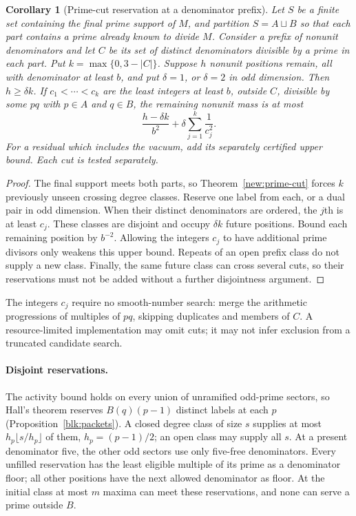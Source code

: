 \documentclass[11pt]{amsart}
\numberwithin{equation}{section}
\newtheorem{corollary}[theorem]{Corollary}
\theoremstyle{definition}
\theoremstyle{plain}
\begin{document}
\begin{corollary}[Prime-cut reservation at a denominator prefix]
\label{new:prime-cut-prefix}
Let $S$ be a finite set containing the final prime support of $M$,
and partition $S=A\sqcup B$ so that each part contains a prime
already known to divide $M$. Consider a prefix of nonunit
denominators and let $C$ be its set of distinct denominators
divisible by a prime in each part. Put $k=\max\{0,3-|C|\}$.
Suppose $h$ nonunit positions remain, all with denominator at least
$b$, and put $\delta=1$, or $\delta=2$ in odd dimension.
Then $h\ge\delta k$. If $c_1<\cdots<c_k$ are the least integers
at least $b$, outside $C$, divisible by some $pq$ with $p\in A$
and $q\in B$, the remaining nonunit mass is at most
\begin{equation}\label{eq:prime-cut-prefix-mass}
 \frac{h-\delta k}{b^2}+\delta\sum_{j=1}^k\frac1{c_j^2}.
\end{equation}
For a residual which includes the vacuum, add its separately
certified upper bound. Each cut is tested separately.
\end{corollary}
\begin{proof}
The final support meets both parts, so Theorem~\ref{new:prime-cut}
forces $k$ previously unseen crossing degree classes. Reserve one
label from each, or a dual pair in odd dimension. When their distinct
denominators are ordered, the $j$th is at least $c_j$. These classes
are disjoint and occupy $\delta k$ future positions. Bound each
remaining position by $b^{-2}$. Allowing the integers $c_j$ to have
additional prime divisors only weakens this upper bound. Repeats of
an open prefix class do not supply a new class. Finally, the same
future class can cross several cuts, so their reservations must not
be added without a further disjointness argument.
\end{proof}

The integers $c_j$ require no smooth-number search: merge the
arithmetic progressions of multiples of $pq$, skipping duplicates
and members of $C$. A resource-limited implementation may omit cuts;
it may not infer exclusion from a truncated candidate search.

\paragraph{Disjoint reservations.}
The activity bound holds on every union of unramified odd-prime
sectors, so Hall's theorem reserves $B(q)(p-1)$ distinct labels
at each $p$ (Proposition~\ref{blk:packets}). A closed degree class
of size $s$ supplies at most $h_p\lfloor s/h_p\rfloor$ of them,
$h_p=(p-1)/2$; an open class may supply all $s$.
At a present denominator five, the other odd sectors use only
five-free denominators. Every unfilled reservation has the least
eligible multiple of its prime as a denominator floor; all other
positions have the next allowed denominator as floor. At the initial
class at most $m$ maxima can meet these reservations, and none
can serve a prime outside $B$.
\end{document}
